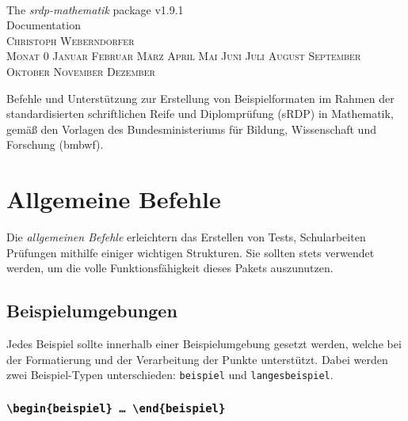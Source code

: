 \documentclass[a4paper,12pt]{article}
\makeatletter
\renewcommand*\tableofcontents{\@starttoc{toc}}
\newcommand{\Monat}{%
\ifcase\month
 Monat 0 \or Januar \or Februar \or März  \or April \or Mai \or Juni \or Juli%
 \or August \or September \or Oktober \or November \or Dezember
\fi}
\makeatother
\begin{document}
\begin{titlepage}
\thispagestyle{empty}
\begin{center}
~

\vfill

\Huge The \textit{srdp-mathematik} package v1.9.1\\[1cm]

Documentation \\ [1cm]

\flushright
\textsc{\large Christoph Weberndorfer} \\[-0.5cm]
\textsc{\large \Monat~\the\year} \\
\vfill

\centering
\normalsize 
Befehle und Unterstützung zur Erstellung von Beispielformaten im Rahmen der standardisierten schriftlichen Reife und Diplomprüfung (sRDP) in Mathematik, gemäß den Vorlagen des Bundesministeriums für Bildung, Wissenschaft und Forschung (bmbwf). 
\vfill 

\begingroup
\let\cleardoublepage\relax
\let\clearpage\relax
\normalsize \tableofcontents
\endgroup

\leer


\end{center}


\end{titlepage}


\section{Allgemeine Befehle}
Die \textit{allgemeinen Befehle} erleichtern das Erstellen von Tests, Schularbeiten Prüfungen mithilfe einiger wichtigen Strukturen. Sie sollten stets verwendet werden, um die volle Funktionsfähigkeit dieses Pakets auszunutzen. 
\vspace{1cm}

\subsection{Beispielumgebungen}

Jedes Beispiel sollte innerhalb einer Beispielumgebung gesetzt werden, welche bei der Formatierung und der Verarbeitung der Punkte unterstützt. Dabei werden zwei Beispiel-Typen unterschieden: \texttt{beispiel} und \texttt{langesbeispiel}.   

\vspace{1cm}
\subsubsection{\texttt{\textbackslash begin\{beispiel\} \ldots\ \textbackslash end\{beispiel\}}}
\end{document}

